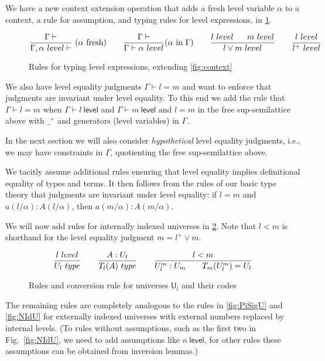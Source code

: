 \documentclass[a4paper,UKenglish,cleveref, autoref, thm-restate]{lipics-v2021}
\newcommand{\UU}{\mathsf{U}}
\newcommand{\Level}{\mathsf{level}}
\newcommand{\type}{\mathsf{type}}
\newcommand{\T}{\mathsf{T}}
\begin{document}
We have a new context extension operation that adds a fresh level variable
$\alpha$ to a context, a rule for assumption, and typing rules
for level expressions, in \cref{fig:contextL}.

\begin{figure}[h!]
$$
\frac{\Gamma\vdash}{\Gamma,\alpha~\Level\vdash}~(\alpha~\text{fresh})~~~~~~
\frac{\Gamma\vdash}{\Gamma\vdash\alpha~\Level}(\alpha~\text{in}~\Gamma)~~~~~~
\frac{l~\Level~~~~~m~\Level}{l\vee m~\Level}~~~~~~
\frac{l~\Level}{l^+~\Level}
\belowdisplayshortskip 0pt
$$
  \caption{Rules for typing level expressions, extending
  \cref{fig:context}}\label{fig:contextL}
\end{figure}

We also have level equality judgments $\Gamma\vdash l = m$
and want to enforce that judgments are invariant under level equality.
To this end we add the rule that $\Gamma\vdash l = m$
when $\Gamma\vdash l~\Level$ and $\Gamma\vdash m~\Level$ and
$l=m$ in the free sup-semilattice above with $\_^+$ and generators
(level variables) in $\Gamma$.

In the next section we will also consider \emph{hypothetical} level
equality judgments, i.e., we may have constraints in $\Gamma$,
quotienting the free sup-semilattice above.

We tacitly assume additional %
rules ensuring that level equality
implies definitional equality of types and terms.
It then follows from the rules of our basic type theory that
judgments are invariant under level equality: if $l=m$ and
${a(l/\alpha) : A(l/\alpha)}$, then ${a(m/\alpha) : A(m/\alpha)}$.

We will now add rules for internally indexed universes in \cref{fig:typeUl}.
Note that $l<m$ is shorthand for the level equality judgment
$m= l^+ \vee m$.
\begin{figure}[h!]
$$
\frac{l~\Level}{\UU_l~\type}~~~~~~
\frac{A:\UU_{l}}{\T_{l}(A)~\type}~~~~~~
\frac{l<m}{\UU^{m}_{l}:\UU_{m}~~~~~~\T_{m}({\UU^{m}_{l}}) = \UU_{l}}
\belowdisplayshortskip 0pt
$$
  \caption{Rules and conversion rule for universes $\UU_l$ and their codes}\label{fig:typeUl}
\end{figure}

The remaining rules are completely analogous to the rules in
\cref{fig:PiSigU} and \cref{fig:NIdU}
for externally indexed universes with external numbers replaced
by internal levels. (To rules without assumptions, such as the first two
in Fig.~\ref{fig:NIdU}, we need to add assumptions like $n~\Level$,
for other rules these assumptions can be obtained from inversion lemmas.)
\end{document}
